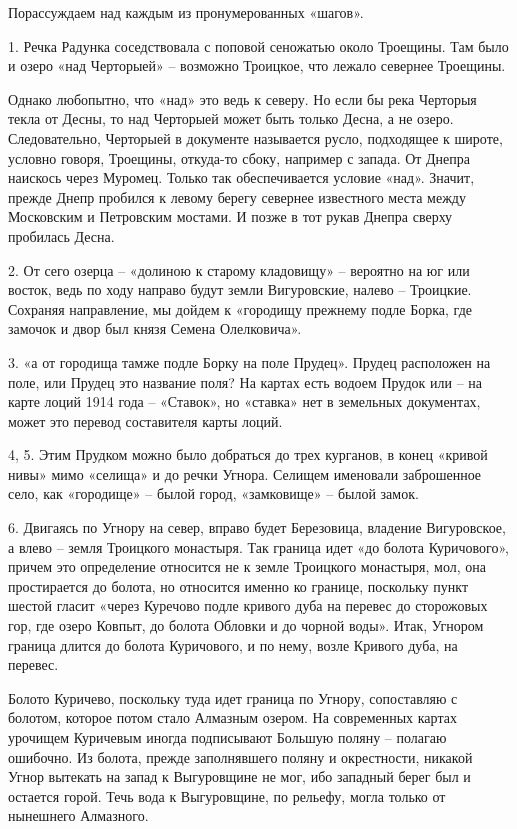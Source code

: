 Порассуждаем над каждым из пронумерованных «шагов».

1. Речка Радунка соседствовала с поповой сеножатью около Троещины. Там было и озеро «над Черторыей» – возможно Троицкое, что лежало севернее Троещины.

Однако любопытно, что «над» это ведь к северу. Но если бы река Черторыя текла от Десны, то над Черторыей может быть только Десна, а не озеро. Следовательно, Черторыей в документе называется русло, подходящее к широте, условно говоря, Троещины, откуда-то сбоку, например с запада. От Днепра наискось через Муромец. Только так обеспечивается условие «над». Значит, прежде Днепр пробился к левому берегу севернее известного места между Московским и Петровским мостами. И позже в тот рукав Днепра сверху пробилась Десна.

2. От сего озерца – «долиною к старому кладовищу» – вероятно на юг или восток, ведь по ходу направо будут земли Вигуровские, налево – Троицкие. Сохраняя направление, мы дойдем к «городищу прежнему подле Борка, где замочок и двор был князя Семена Олелковича».

3. «а от городища тамже подле Борку на поле Прудец». Прудец расположен на поле, или Прудец это название поля? На картах есть водоем Прудок или – на карте лоций 1914 года – «Ставок», но «ставка» нет в земельных документах, может это перевод составителя карты лоций.

4, 5. Этим Прудком можно было добраться до трех курганов, в конец «кривой нивы» мимо «селища» и до речки Угнора. Селищем именовали заброшенное село, как «городище» – былой город, «замковище» – былой замок.

6. Двигаясь по Угнору на север, вправо будет Березовица, владение Вигуровское, а влево – земля Троицкого монастыря. Так граница идет «до болота Куричового», причем это определение относится не к земле Троицкого монастыря, мол, она простирается до болота, но относится именно ко границе, поскольку пункт шестой гласит «через Куречово подле кривого дуба на перевес до сторожовых гор, где озеро Ковпыт, до болота Обловки и до чорной воды». Итак, Угнором граница длится до болота Куричового, и по нему, возле Кривого дуба, на перевес.

Болото Куричево, поскольку туда идет граница по Угнору, сопоставляю с болотом, которое потом стало Алмазным озером. На современных картах урочищем Куричевым иногда подписывают Большую поляну – полагаю ошибочно. Из болота, прежде заполнявшего поляну и окрестности, никакой Угнор вытекать на запад к Выгуровщине не мог, ибо западный берег был и остается горой. Течь вода к Выгуровщине, по рельефу, могла только от нынешнего Алмазного.

